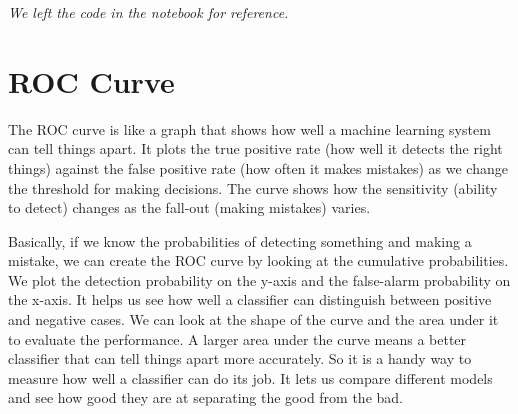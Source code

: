 \textit{We left the code in the notebook for reference.}

\section{ROC Curve}
The ROC curve is like a graph that shows how well a machine learning system can tell things apart. It plots the true positive rate (how well it detects the right things) against the false positive rate (how often it makes mistakes) as we change the threshold for making decisions. The curve shows how the sensitivity (ability to detect) changes as the fall-out (making mistakes) varies.

Basically, if we know the probabilities of detecting something and making a mistake, we can create the ROC curve by looking at the cumulative probabilities. We plot the detection probability on the y-axis and the false-alarm probability on the x-axis.
It helps us see how well a classifier can distinguish between positive and negative cases. We can look at the shape of the curve and the area under it to evaluate the performance. A larger area under the curve means a better classifier that can tell things apart more accurately.
So it is a handy way to measure how well a classifier can do its job. It lets us compare different models and see how good they are at separating the good from the bad.

